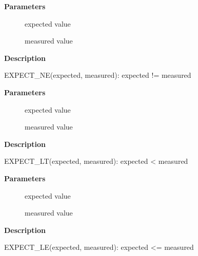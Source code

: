 \documentclass[a4paper,8pt,english]{sphinxmanual}
\begin{document}
\textbf{Parameters}
\begin{description}
\item[{}] \leavevmode
expected value

\item[{}] \leavevmode
measured value

\end{description}

\textbf{Description}

EXPECT\_NE(expected, measured): expected != measured

\begin{fulllineitems}
\label{dev-tools/kselftest:c.EXPECT_LT}
\end{fulllineitems}


\textbf{Parameters}
\begin{description}
\item[{}] \leavevmode
expected value

\item[{}] \leavevmode
measured value

\end{description}

\textbf{Description}

EXPECT\_LT(expected, measured): expected \textless{} measured

\begin{fulllineitems}
\label{dev-tools/kselftest:c.EXPECT_LE}
\end{fulllineitems}


\textbf{Parameters}
\begin{description}
\item[{}] \leavevmode
expected value

\item[{}] \leavevmode
measured value

\end{description}

\textbf{Description}

EXPECT\_LE(expected, measured): expected \textless{}= measured

\begin{fulllineitems}
\label{dev-tools/kselftest:c.EXPECT_GT}
\end{fulllineitems}
\end{document}
